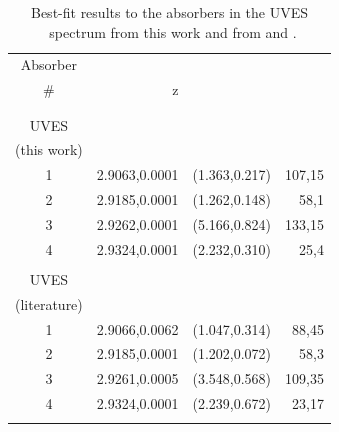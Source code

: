 \begin{table}
\caption[\lya~$\lam1216$ absorption line best-fit results from MUSE and UVES 1D spectra]{Best-fit results to the absorbers in the UVES \lya~spectrum from this work and from \citet{jarvis2003} and \citet{wilman2004}.}
\centering
\begin{tabular}{c D{,}{\, \,\pm\, \,}{-3} D{,}{\, \,\pm\, \,}{-3} D{,}{\, \,\pm\, \,}{-3}   }
\hline\hline                    
Absorber                &                         &                                              &    \\
        \#                                      & z                                                                             &        &       \\ 
                                                                                                & & & \\
                                                \hline
                                                & & & \\
                                                UVES  & & & \\
                                                (this work) & & & \\
                1                               & 2.9063,0.0001         & (1.363,0.217)   & 107,15\\
                2                               & 2.9185,0.0001         & (1.262,0.148)   & 58,1 \\
                3                               & 2.9262,0.0001         & (5.166,0.824)   & 133,15\\
                4                               & 2.9324,0.0001         & (2.232,0.310)   & 25,4 \\
                                                & & & \\
                                                UVES  & & & \\
                                                (literature) & & & \\
                1                               &       2.9066,0.0062           & (1.047,0.314)     & 88,45 \\
                2                               &       2.9185,0.0001           & (1.202,0.072)     & 58,3 \\
                3                               &       2.9261,0.0005           & (3.548,0.568)     & 109,35 \\
                4                               &       2.9324,0.0001           & (2.239,0.672)     & 23,17 \\
                                                & & & \\
\hline
\end{tabular}
\label{table:absorption-fits-uves}
\end{table}

